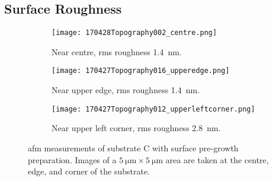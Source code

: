 \subsection{Surface Roughness}
\begin{figure}[htbp]
    \centering
    \begin{subfigure}[t]{\linewidth}
    \centering
        \texttt{[image: 170428Topography002\_centre.png]}
        \caption{Near centre, \ac{rms} roughness \SI{1.4}{\nano\metre}.}  %
    \end{subfigure}%
    \par\bigskip
    \begin{subfigure}[t]{\linewidth}
    \centering
        \texttt{[image: 170427Topography016\_upperedge.png]}
        \caption{Near upper edge, \ac{rms} roughness \SI{1.4}{\nano\metre}.}  %
    \end{subfigure}%
    \par\bigskip
    \begin{subfigure}[t]{\linewidth}
    \centering
        \texttt{[image: 170427Topography012\_upperleftcorner.png]}
        \caption{Near upper left corner, \ac{rms} roughness \SI{2.8}{\nano\metre}.}  %
    \end{subfigure}%
    \caption[\Ac{afm} of substrate C with surface pre-growth preparation.]{\Acf{afm} measurements of substrate C with surface pre-growth preparation. Images of a $\SI{5}{\micro\metre}\times\SI{5}{\micro\metre}$ area are taken at the centre, edge, and corner of the substrate.}
    \label{fig:afm_subCb}
\end{figure} %

